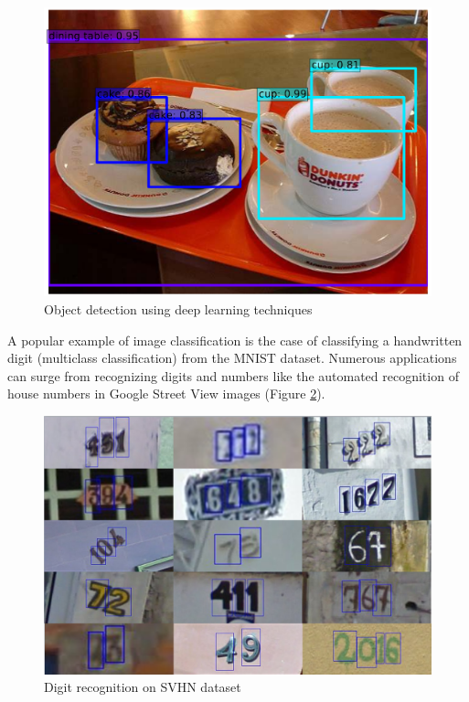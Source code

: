 \begin{figure}[H]
\begin{center}
\includegraphics[scale=0.35]{figures/ssd_detection.png}
\caption{Object detection using deep learning techniques \cite{liu2016ssd}}
\label{fig:ssd_detection}
\end{center}
\end{figure}
A popular example of image classification is the case of classifying a handwritten digit (multiclass classification) from the MNIST dataset. Numerous applications can surge from recognizing digits and numbers like the automated recognition of house numbers in Google Street View images (Figure \ref{svhn}).
\begin{figure}[H]
\begin{center}
\includegraphics[scale=0.3]{figures/svhn.png}
\caption{Digit recognition on SVHN dataset \cite{netzer2011reading}}
\label{svhn}
\end{center}
\end{figure}
